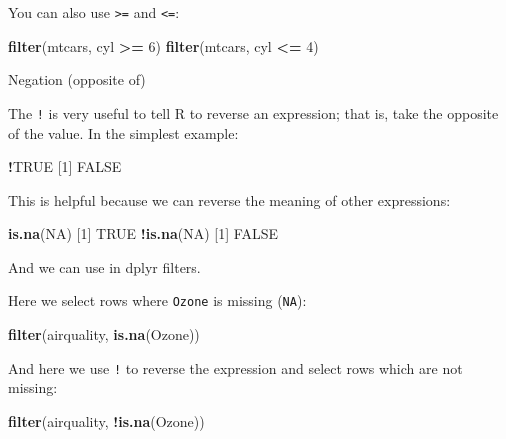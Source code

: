 \documentclass[]{article}
\newenvironment{Shaded}{\begin{snugshade}}{\end{snugshade}}
\newcommand{\DecValTok}[1]{\textcolor[rgb]{0.00,0.00,0.81}{#1}}
\newcommand{\KeywordTok}[1]{\textcolor[rgb]{0.13,0.29,0.53}{\textbf{#1}}}
\newcommand{\NormalTok}[1]{#1}
\newcommand{\OperatorTok}[1]{\textcolor[rgb]{0.81,0.36,0.00}{\textbf{#1}}}
\newcommand{\OtherTok}[1]{\textcolor[rgb]{0.56,0.35,0.01}{#1}}
\newcommand{\StringTok}[1]{\textcolor[rgb]{0.31,0.60,0.02}{#1}}
\begin{document}
You can also use \texttt{\textgreater{}=} and \texttt{\textless{}=}:

\begin{Shaded}
\begin{Highlighting}[]
\KeywordTok{filter}\NormalTok{(mtcars, cyl }\OperatorTok{>=}\StringTok{ }\DecValTok{6}\NormalTok{)}
\KeywordTok{filter}\NormalTok{(mtcars, cyl }\OperatorTok{<=}\StringTok{ }\DecValTok{4}\NormalTok{)}
\end{Highlighting}
\end{Shaded}

Negation (opposite of)

The \texttt{!} is very useful to tell R to reverse an expression; that is, take the
opposite of the value. In the simplest example:

\begin{Shaded}
\begin{Highlighting}[]
\OperatorTok{!}\OtherTok{TRUE}
\NormalTok{[}\DecValTok{1}\NormalTok{] }\OtherTok{FALSE}
\end{Highlighting}
\end{Shaded}

This is helpful because we can reverse the meaning of other expressions:

\begin{Shaded}
\begin{Highlighting}[]
\KeywordTok{is.na}\NormalTok{(}\OtherTok{NA}\NormalTok{)}
\NormalTok{[}\DecValTok{1}\NormalTok{] }\OtherTok{TRUE}
\OperatorTok{!}\KeywordTok{is.na}\NormalTok{(}\OtherTok{NA}\NormalTok{)}
\NormalTok{[}\DecValTok{1}\NormalTok{] }\OtherTok{FALSE}
\end{Highlighting}
\end{Shaded}

And we can use in dplyr filters.

Here we select rows where \texttt{Ozone} is missing (\texttt{NA}):

\begin{Shaded}
\begin{Highlighting}[]
\KeywordTok{filter}\NormalTok{(airquality, }\KeywordTok{is.na}\NormalTok{(Ozone))}
\end{Highlighting}
\end{Shaded}

And here we use \texttt{!} to reverse the expression and select rows which are not
missing:

\begin{Shaded}
\begin{Highlighting}[]
\KeywordTok{filter}\NormalTok{(airquality, }\OperatorTok{!}\KeywordTok{is.na}\NormalTok{(Ozone))}
\end{Highlighting}
\end{Shaded}
\end{document}
